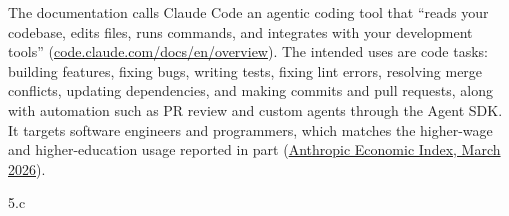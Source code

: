 \begin{answer}
  The documentation calls Claude Code an agentic coding tool that ``reads your codebase, edits
  files, runs commands, and integrates with your development tools''
  (\href{https://code.claude.com/docs/en/overview}{code.claude.com/docs/en/overview}). The intended
  uses are code tasks: building features, fixing bugs, writing tests, fixing lint errors,
  resolving merge conflicts, updating dependencies, and making commits and pull requests, along
  with automation such as PR review and custom agents through the Agent SDK. It targets software engineers and programmers, which
  matches the higher-wage and higher-education usage reported in part (\href{https://www.anthropic.com/research/economic-index-march-2026-report}{Anthropic Economic
  Index, March 2026}).
\end{answer}

\LARGE
5.c
\normalsize

